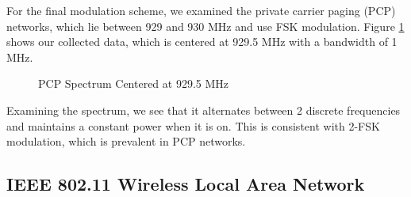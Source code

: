 \documentclass{article}
\begin{document}
For the final modulation scheme, we examined the private carrier paging (PCP) networks, which lie between 929 and 930 MHz and use FSK modulation. Figure \ref{fig::930MHz_fsk_spectrum} shows our collected data, which is centered at 929.5 MHz with a bandwidth of 1 MHz.

\begin{figure}[H]
	\centerline{}
	\caption{PCP Spectrum Centered at 929.5 MHz}
	\label{fig::930MHz_fsk_spectrum}
\end{figure}

Examining the spectrum, we see that it alternates between 2 discrete frequencies and maintains a constant power when it is on. This is consistent with 2-FSK modulation, which is prevalent in PCP networks.




\subsection{IEEE 802.11 Wireless Local Area Network}
\end{document}
